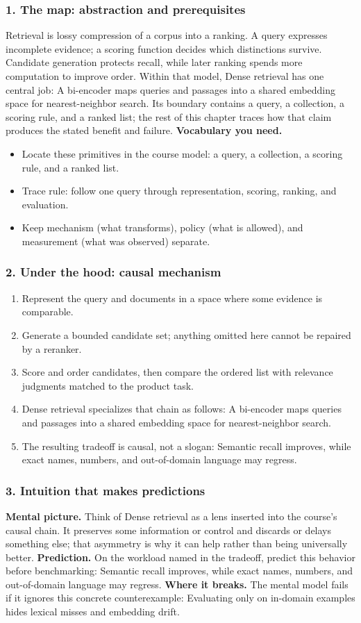 \subsubsection*{1. The map: abstraction and prerequisites}
Retrieval is lossy compression of a corpus into a ranking. A query expresses incomplete evidence; a scoring function decides which distinctions survive. Candidate generation protects recall, while later ranking spends more computation to improve order.
Within that model, Dense retrieval has one central job: A bi-encoder maps queries and passages into a shared embedding space for nearest-neighbor search. Its boundary contains a query, a collection, a scoring rule, and a ranked list; the rest of this chapter traces how that claim produces the stated benefit and failure.
\textbf{Vocabulary you need.}\begin{itemize}
\item Locate these primitives in the course model: a query, a collection, a scoring rule, and a ranked list.
\item Trace rule: follow one query through representation, scoring, ranking, and evaluation.
\item Keep mechanism (what transforms), policy (what is allowed), and measurement (what was observed) separate.
\end{itemize}
\subsubsection*{2. Under the hood: causal mechanism}\begin{enumerate}
\item Represent the query and documents in a space where some evidence is comparable.
\item Generate a bounded candidate set; anything omitted here cannot be repaired by a reranker.
\item Score and order candidates, then compare the ordered list with relevance judgments matched to the product task.
\item Dense retrieval specializes that chain as follows: A bi-encoder maps queries and passages into a shared embedding space for nearest-neighbor search.
\item The resulting tradeoff is causal, not a slogan: Semantic recall improves, while exact names, numbers, and out-of-domain language may regress.
\end{enumerate}
\subsubsection*{3. Intuition that makes predictions}
\textbf{Mental picture.} Think of Dense retrieval as a lens inserted into the course's causal chain. It preserves some information or control and discards or delays something else; that asymmetry is why it can help rather than being universally better.
\textbf{Prediction.} On the workload named in the tradeoff, predict this behavior before benchmarking: Semantic recall improves, while exact names, numbers, and out-of-domain language may regress.
\textbf{Where it breaks.} The mental model fails if it ignores this concrete counterexample: Evaluating only on in-domain examples hides lexical misses and embedding drift.
